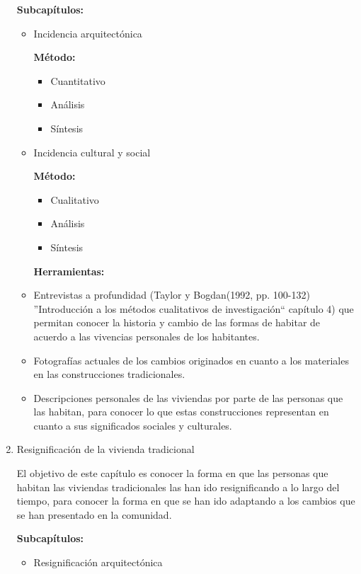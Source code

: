 \begin{enumerate}
    \textbf{Subcapítulos:}
    \begin{itemize}
      \item Incidencia arquitectónica
        
        \textbf{Método:}
        \begin{itemize}
          \item Cuantitativo
          \item Análisis
          \item Síntesis
        \end{itemize}

      \item Incidencia cultural y social
        
        \textbf{Método:}
        \begin{itemize}
          \item Cualitativo
          \item Análisis
          \item Síntesis
        \end{itemize}

      \textbf{Herramientas:}
      
      \item Entrevistas a profundidad (Taylor y Bogdan(1992, pp. 100-132) ''Introducción a los métodos cualitativos de investigación`` capítulo 4) que permitan conocer la historia y cambio de las formas de habitar de acuerdo a las vivencias personales de los habitantes.
      \item Fotografías actuales de los cambios originados en cuanto a los materiales en las construcciones tradicionales.
      \item Descripciones personales de las viviendas por parte de las personas que las habitan, para conocer lo que estas construcciones representan en cuanto a sus significados sociales y culturales.

    \end{itemize}

  \item Resignificación de la vivienda tradicional

    El objetivo de este capítulo es conocer la forma en que las personas que habitan las viviendas tradicionales las han ido resignificando a lo largo del tiempo, para conocer la forma en que se han ido adaptando a los cambios que se han presentado en la comunidad.

    \textbf{Subcapítulos:}
    \begin{itemize}
      \item Resignificación arquitectónica
        

\end{itemize}
\end{enumerate}
